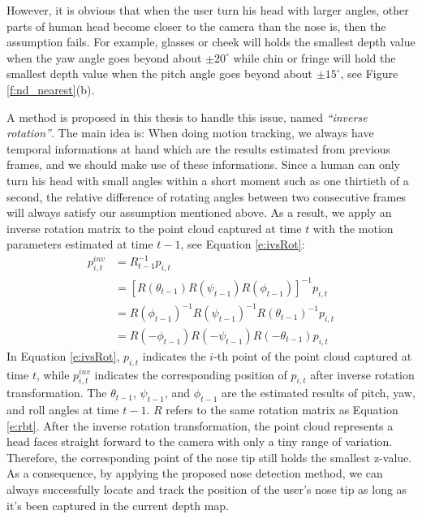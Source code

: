 However, it is obvious that when the user turn his head with larger angles, other parts of human head become closer to the camera than the nose is, then the assumption fails. For example, glasses or cheek will holds the smallest depth value when the yaw angle goes beyond about $\pm{20^{\circ}}$ while chin or fringe will hold the smallest depth value when the pitch angle goes beyond about $\pm{15^{\circ}}$, see Figure \ref{f:nd_nearest}(b). 

A method is proposed in this thesis to handle this issue, named \emph{``inverse rotation''}. The main idea is: When doing motion tracking, we always have temporal informations at hand which are the results estimated from previous frames, and we should make use of these informations. Since a human can only turn his head with small angles within a short moment such as one thirtieth of a second, the relative difference of rotating angles between two consecutive frames will always satisfy our assumption mentioned above. As a result, we apply an inverse rotation matrix to the point cloud captured at time $t$ with the motion parameters estimated at time $t-1$, see Equation \ref{e:ivsRot}:
\begin{equation}
\begin{aligned}
p^{inv}_{i,t} &= R^{-1}_{t-1}p_{i,t}\\
&= [R(\theta _{t-1})R(\psi _{t-1})R(\phi _{t-1})]^{-1}p_{i,t}\\
&= R(\phi _{t-1})^{-1}R(\psi _{t-1})^{-1}R(\theta _{t-1})^{-1}p_{i,t}\\
&= R(-\phi _{t-1})R(-\psi _{t-1})R(-\theta _{t-1})p_{i,t}
\end{aligned}
\label{e:ivsRot}
\end{equation}
In Equation \ref{e:ivsRot}, $p_{i,t}$ indicates the $i$-th point of the point cloud captured at time $t$, while $p^{inv}_{i,t}$ indicates the corresponding position of $p_{i,t}$ after inverse rotation transformation. The $\theta _{t-1}$, $\psi _{t-1}$, and $\phi _{t-1}$ are the estimated results of pitch, yaw, and roll angles at time $t-1$. $R$ refers to the same rotation matrix as Equation \ref{e:rbt}. After the inverse rotation transformation, the point cloud represents a head faces straight forward to the camera with only a tiny range of variation. Therefore, the corresponding point of the nose tip still holds the smallest z-value. As a consequence, by applying the proposed nose detection method, we can always successfully locate and track the position of the user's nose tip as long as it's been captured in the current depth map. 

